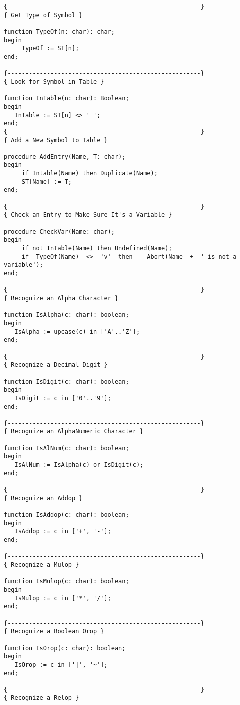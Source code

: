 \begin{verbatim}
{------------------------------------------------------}
{ Get Type of Symbol }

function TypeOf(n: char): char;
begin
     TypeOf := ST[n];
end;

{------------------------------------------------------}
{ Look for Symbol in Table }

function InTable(n: char): Boolean;
begin
   InTable := ST[n] <> ' ';
end;
{------------------------------------------------------}
{ Add a New Symbol to Table }

procedure AddEntry(Name, T: char);
begin
     if Intable(Name) then Duplicate(Name);
     ST[Name] := T;
end;

{------------------------------------------------------}
{ Check an Entry to Make Sure It's a Variable }

procedure CheckVar(Name: char);
begin
     if not InTable(Name) then Undefined(Name);
     if  TypeOf(Name)  <>  'v'  then    Abort(Name  +  ' is not a
variable');
end;

{------------------------------------------------------}
{ Recognize an Alpha Character }

function IsAlpha(c: char): boolean;
begin
   IsAlpha := upcase(c) in ['A'..'Z'];
end;

{------------------------------------------------------}
{ Recognize a Decimal Digit }

function IsDigit(c: char): boolean;
begin
   IsDigit := c in ['0'..'9'];
end;

{------------------------------------------------------}
{ Recognize an AlphaNumeric Character }

function IsAlNum(c: char): boolean;
begin
   IsAlNum := IsAlpha(c) or IsDigit(c);
end;

{------------------------------------------------------}
{ Recognize an Addop }

function IsAddop(c: char): boolean;
begin
   IsAddop := c in ['+', '-'];
end;

{------------------------------------------------------}
{ Recognize a Mulop }

function IsMulop(c: char): boolean;
begin
   IsMulop := c in ['*', '/'];
end;

{------------------------------------------------------}
{ Recognize a Boolean Orop }

function IsOrop(c: char): boolean;
begin
   IsOrop := c in ['|', '~'];
end;

{------------------------------------------------------}
{ Recognize a Relop }


\end{verbatim}
